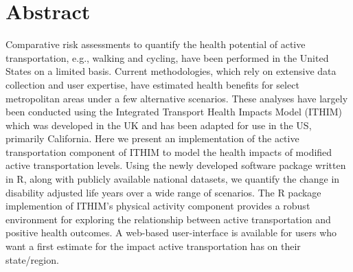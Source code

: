 \documentclass[10pt,letterpaper]{article}\usepackage[]{graphicx}\usepackage[]{color}
\begin{document}
\begin{flushleft}





\end{flushleft}

\section*{Abstract}


Comparative risk assessments to quantify the health potential
of active transportation, e.g., walking and cycling, have been
performed in the United States on a limited basis. Current
methodologies, which rely on extensive data collection and user
expertise, have estimated health benefits for select metropolitan
areas under a few alternative scenarios. These analyses have largely
been conducted using the Integrated Transport Health Impacts Model
(ITHIM) which was developed in the UK and has been adapted for use in
the US, primarily California. Here we present an implementation of the
active transportation component of ITHIM to model the health impacts
of modified active transportation levels. Using the newly developed
software package \package{} written in R, along with publicly
available national datasets, we quantify the change in disability
adjusted life years over a wide range of scenarios.  The R package
implemention of ITHIM's physical activity component provides a robust
environment for exploring the relationship between active
transportation and positive health outcomes.  A web-based
user-interface is available for users who want a first estimate for
the impact active transportation has on their
state/region.

%

% 
\end{document}
